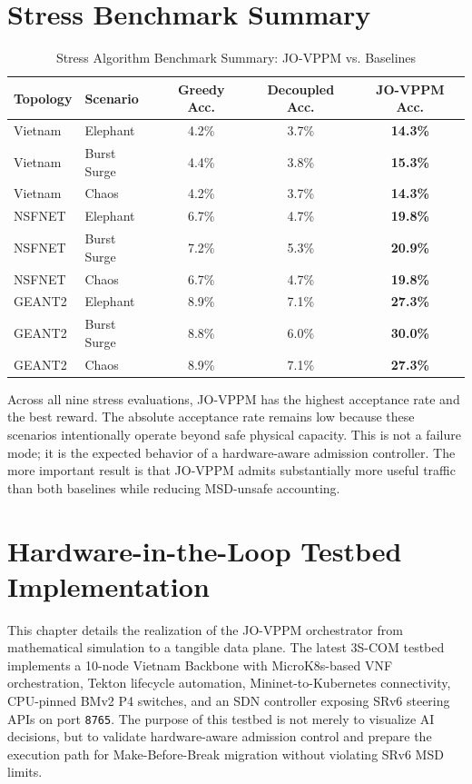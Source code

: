 \documentclass[12pt, a4paper, reqno, oneside]{book}
\begin{document}
\section{Stress Benchmark Summary}

\begin{table}[H]
\centering
\caption{Stress Algorithm Benchmark Summary: JO-VPPM vs. Baselines}
\label{table:algorithm_stress_summary}
\renewcommand{\arraystretch}{1.15}
\small
\begin{tabular}{llccc}
\toprule
\textbf{Topology} & \textbf{Scenario} & \textbf{Greedy Acc.} & \textbf{Decoupled Acc.} & \textbf{JO-VPPM Acc.} \\
\midrule
Vietnam & Elephant & 4.2\% & 3.7\% & \textbf{14.3\%} \\
Vietnam & Burst Surge & 4.4\% & 3.8\% & \textbf{15.3\%} \\
Vietnam & Chaos & 4.2\% & 3.7\% & \textbf{14.3\%} \\
NSFNET & Elephant & 6.7\% & 4.7\% & \textbf{19.8\%} \\
NSFNET & Burst Surge & 7.2\% & 5.3\% & \textbf{20.9\%} \\
NSFNET & Chaos & 6.7\% & 4.7\% & \textbf{19.8\%} \\
GEANT2 & Elephant & 8.9\% & 7.1\% & \textbf{27.3\%} \\
GEANT2 & Burst Surge & 8.8\% & 6.0\% & \textbf{30.0\%} \\
GEANT2 & Chaos & 8.9\% & 7.1\% & \textbf{27.3\%} \\
\bottomrule
\end{tabular}
\end{table}

Across all nine stress evaluations, JO-VPPM has the highest acceptance rate and the best reward. The absolute acceptance rate remains low because these scenarios intentionally operate beyond safe physical capacity. This is not a failure mode; it is the expected behavior of a hardware-aware admission controller. The more important result is that JO-VPPM admits substantially more useful traffic than both baselines while reducing MSD-unsafe accounting.

\section{Hardware-in-the-Loop Testbed Implementation}
\label{chap:testbed}

This chapter details the realization of the JO-VPPM orchestrator from mathematical simulation to a tangible data plane. The latest 3S-COM testbed implements a 10-node Vietnam Backbone with MicroK8s-based VNF orchestration, Tekton lifecycle automation, Mininet-to-Kubernetes connectivity, CPU-pinned BMv2 P4 switches, and an SDN controller exposing SRv6 steering APIs on port \texttt{8765}. The purpose of this testbed is not merely to visualize AI decisions, but to validate hardware-aware admission control and prepare the execution path for Make-Before-Break migration without violating SRv6 MSD limits.
\end{document}
